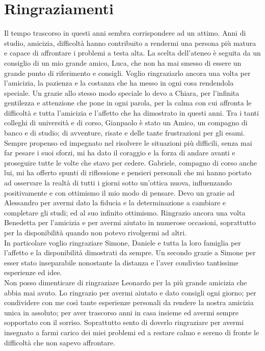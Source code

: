 \documentclass[a4paper,12pt]{tesiinfo}
\begin{document}
\chapter*{Ringraziamenti}
Il tempo trascorso in questi anni sembra corrispondere ad un attimo. Anni di studio, amicizia, difficolt\`a hanno contribuito a rendermi una persona pi\`u matura e capace di affrontare i problemi a testa alta. La scelta dell'ateneo \`e seguita da un consiglio di un mio grande amico, Luca, che non ha mai smesso di essere un grande punto di riferimento e consigli. Voglio ringraziarlo ancora una volta per l'amicizia, la pazienza e la costanza che ha messo in ogni cosa rendendola speciale. Un grazie allo stesso modo speciale lo devo a Chiara, per l'infinita gentilezza e attenzione che pone in ogni parola, per la calma con cui affronta le difficolt\`a e tutta l'amicizia e l'affetto che ha dimostrato in questi anni. Tra i tanti colleghi di universit\`a e di corso, Gianpaolo \`e stato un Amico, un compagno di banco e di studio; di avventure, risate e delle tante frustrazioni per gli esami. Sempre propenso ed impegnato nel risolvere le situazioni pi\`u difficili, senza mai far pesare i suoi sforzi, mi ha dato il coraggio e la forza di andare avanti e proseguire tutte le volte che stavo per cedere. Gabriele, compagno di corso anche lui, mi ha offerto spunti di riflessione e pensieri personali che mi hanno portato ad osservare la realt\`a di tutti i giorni sotto un'ottica nuova, influenzando positivamente e con ottimismo il mio modo di pensare. Devo un grazie ad Alessandro per avermi dato la fiducia e la determinazione a cambiare e completare gli studi; ed al suo infinito ottimismo. Ringrazio ancora una volta Benedetta per l'amicizia e per avermi aiutato in numerose occasioni, soprattutto per la disponibilit\`a quando non potevo rivolgermi ad altri.
\\
In particolare voglio ringraziare Simone, Daniele e tutta la loro famiglia per l'affetto e la disponibilit\`a dimostrati da sempre. Un secondo grazie a Simone per esser stato inseparabile nonostante la distanza e l'aver condiviso tantissime esperienze ed idee.
\\
Non posso dimenticare di ringraziare Leonardo per la pi\`u grande amicizia che abbia mai avuto. Lo ringrazio per avermi aiutato e dato consigli ogni giorno; per condividere con me cos\`i tante esperienze personali da rendere la nostra amicizia unica in assoluto; per aver trascorso anni in casa insieme ed avermi sempre sopportato con il sorriso. Soprattutto sento di doverlo ringraziare per avermi insegnato a farmi carico dei miei problemi ed a restare calmo e sereno di fronte le difficolt\`a che non sapevo affrontare.
\end{document}
